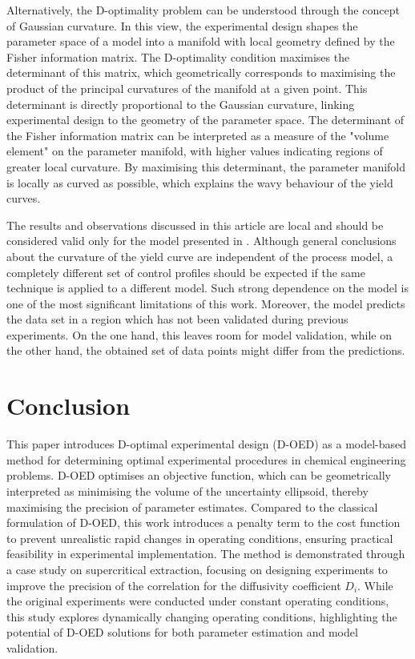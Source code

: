 \documentclass[a4paper,fleqn]{cas-dc}
\begin{document}
		Alternatively, the D-optimality problem can be understood through the concept of Gaussian curvature. In this view, the experimental design shapes the parameter space of a model into a manifold with local geometry defined by the Fisher information matrix. The D-optimality condition maximises the determinant of this matrix, which geometrically corresponds to maximising the product of the principal curvatures of the manifold at a given point. This determinant is directly proportional to the Gaussian curvature, linking experimental design to the geometry of the parameter space. The determinant of the Fisher information matrix can be interpreted as a measure of the "volume element" on the parameter manifold, with higher values indicating regions of greater local curvature. By maximising this determinant, the parameter manifold is locally as curved as possible, which explains the wavy behaviour of the yield curves.
		
		The results and observations discussed in this article are local and should be considered valid only for the model presented in \citet{Sliczniuk2024}. Although general conclusions about the curvature of the yield curve are independent of the process model, a completely different set of control profiles should be expected if the same technique is applied to a different model. Such strong dependence on the model is one of the most significant limitations of this work. Moreover, the model predicts the data set in a region which has not been validated during previous experiments. On the one hand, this leaves room for model validation, while on the other hand, the obtained set of data points might differ from the predictions.
		
		\section{Conclusion} \label{CH: Conclusion}
		This paper introduces D-optimal experimental design (D-OED) as a model-based method for determining optimal	experimental procedures in chemical engineering problems. D-OED optimises an objective function, which can be geometrically	interpreted as minimising the volume of the uncertainty ellipsoid, thereby maximising the precision of parameter estimates. Compared to the classical formulation of D-OED, this work introduces a penalty term to the cost function to prevent unrealistic rapid changes in operating conditions, ensuring practical feasibility in experimental	implementation. The method is demonstrated through a case study on supercritical extraction, focusing on designing experiments	to improve the precision of the correlation for the diffusivity coefficient $D_i$. While the original experiments were conducted under constant operating conditions, this study explores dynamically changing operating conditions, highlighting the potential of D-OED solutions for both parameter estimation and model validation.
		
\end{document}

